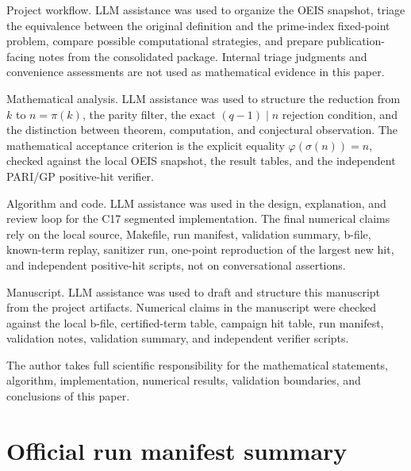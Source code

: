 \documentclass[11pt]{article}
\theoremstyle{definition}
\theoremstyle{remark}
\begin{document}
Project workflow.  LLM assistance was used to organize the OEIS snapshot,
triage the equivalence between the original definition and the prime-index
fixed-point problem, compare possible computational strategies, and prepare
publication-facing notes from the consolidated package.  Internal triage
judgments and convenience assessments are not used as mathematical evidence in
this paper.

Mathematical analysis.  LLM assistance was used to structure the reduction from
\(k\) to \(n=\pi(k)\), the parity filter, the exact \((q-1)\mid n\) rejection
condition, and the distinction between theorem, computation, and conjectural
observation.  The mathematical acceptance criterion is the explicit equality
\(\varphi(\sigma(n))=n\), checked against the local OEIS snapshot, the result tables,
and the independent PARI/GP positive-hit verifier.

Algorithm and code.  LLM assistance was used in the design, explanation, and
review loop for the C17 segmented implementation.  The final numerical claims
rely on the local source, Makefile, run manifest, validation summary, b-file,
known-term replay, sanitizer run, one-point reproduction of the largest new
hit, and independent positive-hit scripts, not on conversational assertions.

Manuscript.  LLM assistance was used to draft and structure this manuscript
from the project artifacts.  Numerical claims in the manuscript were checked
against the local b-file, certified-term table, campaign hit table, run
manifest, validation notes, validation summary, and independent verifier
scripts.

The author takes full scientific responsibility for the mathematical
statements, algorithm, implementation, numerical results, validation
boundaries, and conclusions of this paper.

\clearpage

\appendix

\section{Official run manifest summary}
\label{app:runs}
\end{document}

